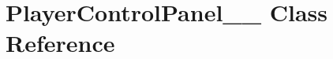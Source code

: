 \hypertarget{classGUI_1_1PlayerControlPanel____6}{}\section{Player\+Control\+Panel\+\_\+\+\_ Class Reference}
\label{classGUI_1_1PlayerControlPanel____6}
